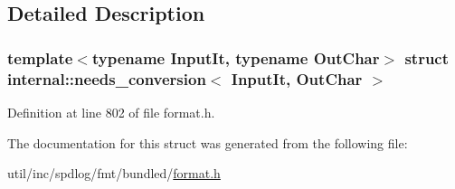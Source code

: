 \subsection{Detailed Description}
\subsubsection*{template$<$typename Input\+It, typename Out\+Char$>$\newline
struct internal\+::needs\+\_\+conversion$<$ Input\+It, Out\+Char $>$}



Definition at line 802 of file format.\+h.



The documentation for this struct was generated from the following file\+:\begin{DoxyCompactItemize}
\item 
util/inc/spdlog/fmt/bundled/\hyperlink{format_8h}{format.\+h}\end{DoxyCompactItemize}
